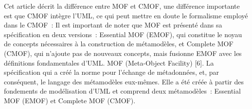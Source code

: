 {Cet article décrit la différence entre MOF et CMOF, une différence importante est que CMOF intègre l'UML, ce qui peut mettre en doute le formalisme employé dans le CMOF~:
 {Il est important de noter que MOF est présenté dans sa spécification en deux versions~: Essential MOF (EMOF), qui constitue le noyau de concepts nécessaires à la construction de métamodèles, et Complete MOF (CMOF), qui n’ajoute pas de nouveaux concepts, mais fusionne EMOF avec les définitions fondamentales d’UML.
\elide MOF (Meta-Object Facility) [6]. La spécification qui a créé la norme pour l’échange de métadonnées, et, par conséquent, le langage des métamodèles eux-mêmes. Elle a été créée à partir des fondements de modélisation d’UML et comprend deux métamodèles~: Essential MOF (EMOF) et Complete MOF (CMOF).} {\cite{cadavid_ten_2012}}

}{}

